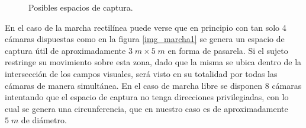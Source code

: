  
\begin{figure}[H]
  \centering
   \hspace{0.2cm}
     \caption{Posibles espacios de captura.}
  \label{img_espacio_capura}
\end{figure} 
 
En el caso de la marcha rectilínea puede verse que en principio con tan solo 4 cámaras dispuestas como en la figura \ref{img_marcha1} se genera un espacio de captura útil de aproximadamente $3\;m\times5\; m$ en forma de pasarela. Si el sujeto restringe su movimiento sobre esta zona, dado que la misma se ubica dentro de la intersección de los campos visuales, será visto en su totalidad por todas las cámaras de manera simultánea. En el caso de marcha libre se disponen 8 cámaras intentando que el espacio de captura no tenga direcciones privilegiadas, con lo cual se genera una circunferencia, que en nuestro caso es de aproximadamente $5\;m$ de diámetro. 


